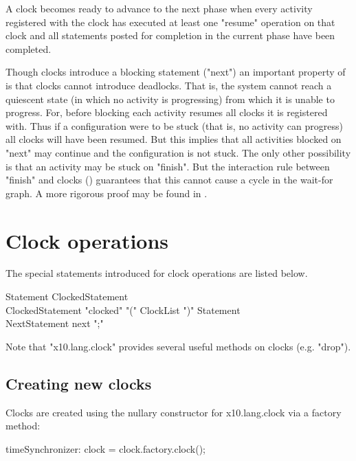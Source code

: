 A clock becomes ready to advance to the next phase when every activity
registered with the clock has executed at least one \xcd"resume"
operation on that clock and all statements posted for completion in
the current phase have been completed.

Though clocks introduce a blocking statement (\xcd"next") an important
property of \Xten{} is that clocks cannot introduce deadlocks. That
is, the system cannot reach a quiescent state (in which no activity is
progressing) from which it is unable to progress. For, before blocking
each activity resumes all clocks it is registered with. Thus if a
configuration were to be stuck (that is, no activity can progress) all
clocks will have been resumed. But this implies that all activities
blocked on \xcd"next" may continue and the configuration is not stuck.
The only other possibility is that an activity may be stuck on
\xcd"finish". But the interaction rule between \xcd"finish" and clocks
() guarantees that this cannot cause a cycle
in the wait-for graph. A more rigorous proof may be found in \cite{X10-concur05}.

\section{Clock operations}\label{sec:clock}
The special statements introduced for clock operations are listed below.
\begin{grammar}
Statement \: ClockedStatement \\
ClockedStatement \: \xcd"clocked" \xcd"(" ClockList \xcd")" Statement \\
NextStatement \: next \xcd";" \\
\end{grammar}

Note that \xcd"x10.lang.clock" provides several useful methods on
clocks (e.g. \xcd"drop").

\subsection{Creating new clocks}\label{sec:clock:create}
Clocks are created using the nullary constructor for {\cf
x10.lang.clock} via a factory method:

\begin{xten}
timeSynchronizer: clock = clock.factory.clock();
\end{xten}


